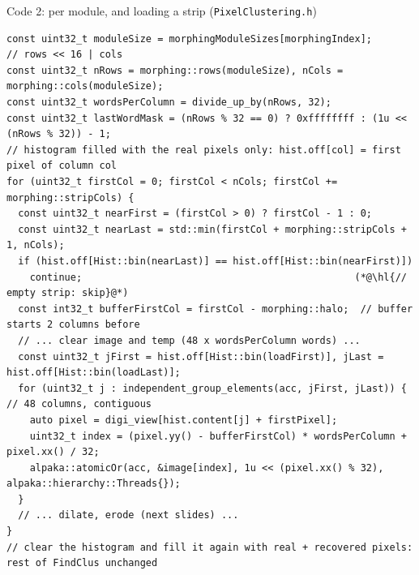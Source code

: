 \documentclass[aspectratio=169,10pt,xcolor=table]{beamer}
\newcommand{\code}[1]{\texttt{\small #1}}
\newcommand{\hl}[1]{\colorbox{cbOrange!25}{#1}}
\begin{document}
\begin{frame}[fragile]{Code 2: per module, and loading a strip (\code{PixelClustering.h})}
\begin{lstlisting}
const uint32_t moduleSize = morphingModuleSizes[morphingIndex];          // rows << 16 | cols
const uint32_t nRows = morphing::rows(moduleSize), nCols = morphing::cols(moduleSize);
const uint32_t wordsPerColumn = divide_up_by(nRows, 32);
const uint32_t lastWordMask = (nRows % 32 == 0) ? 0xffffffff : (1u << (nRows % 32)) - 1;
// histogram filled with the real pixels only: hist.off[col] = first pixel of column col
for (uint32_t firstCol = 0; firstCol < nCols; firstCol += morphing::stripCols) {
  const uint32_t nearFirst = (firstCol > 0) ? firstCol - 1 : 0;
  const uint32_t nearLast = std::min(firstCol + morphing::stripCols + 1, nCols);
  if (hist.off[Hist::bin(nearLast)] == hist.off[Hist::bin(nearFirst)])
    continue;                                               (*@\hl{// empty strip: skip}@*)
  const int32_t bufferFirstCol = firstCol - morphing::halo;  // buffer starts 2 columns before
  // ... clear image and temp (48 x wordsPerColumn words) ...
  const uint32_t jFirst = hist.off[Hist::bin(loadFirst)], jLast = hist.off[Hist::bin(loadLast)];
  for (uint32_t j : independent_group_elements(acc, jFirst, jLast)) {  // 48 columns, contiguous
    auto pixel = digi_view[hist.content[j] + firstPixel];
    uint32_t index = (pixel.yy() - bufferFirstCol) * wordsPerColumn + pixel.xx() / 32;
    alpaka::atomicOr(acc, &image[index], 1u << (pixel.xx() % 32), alpaka::hierarchy::Threads{});
  }
  // ... dilate, erode (next slides) ...
}
// clear the histogram and fill it again with real + recovered pixels: rest of FindClus unchanged
\end{lstlisting}
\end{frame}
\end{document}
